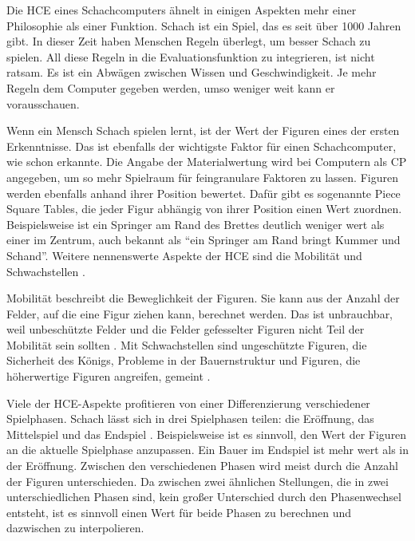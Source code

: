 Die \ac{HCE} eines Schachcomputers ähnelt in einigen Aspekten mehr einer Philosophie als einer Funktion. Schach ist ein Spiel, das es seit über 1000 Jahren gibt. In dieser Zeit haben Menschen Regeln überlegt, um besser Schach zu spielen. All diese Regeln in die Evaluationsfunktion zu integrieren, ist nicht ratsam. Es ist ein Abwägen zwischen Wissen und Geschwindigkeit. Je mehr Regeln dem Computer gegeben werden, umso weniger weit kann er vorausschauen.

Wenn ein Mensch Schach spielen lernt, ist der Wert der Figuren eines der ersten Erkenntnisse. Das ist ebenfalls der wichtigste Faktor für einen Schachcomputer, wie schon \citeauthor{Shannon1950} \citeyear{Shannon1950} \cite{Shannon1950} erkannte. Die Angabe der Materialwertung wird bei Computern als \ac{CP} angegeben, um so mehr Spielraum für feingranulare Faktoren zu lassen. Figuren werden ebenfalls anhand ihrer Position bewertet. Dafür gibt es sogenannte Piece Square Tables, die jeder Figur abhängig von ihrer Position einen Wert zuordnen. Beispielsweise ist ein Springer am Rand des Brettes deutlich weniger wert als einer im Zentrum, auch bekannt als \enquote{ein Springer am Rand bringt Kummer und Schand}. Weitere nennenswerte Aspekte der \ac{HCE} sind die Mobilität und Schwachstellen \cite[S. 228]{Levy1988}.

Mobilität beschreibt die Beweglichkeit der Figuren. Sie kann aus der Anzahl der Felder, auf die eine Figur ziehen kann, berechnet werden. Das ist unbrauchbar, weil unbeschützte Felder und die Felder gefesselter Figuren nicht Teil der Mobilität sein sollten \cite[S. 228]{Levy1988}. Mit Schwachstellen sind ungeschützte Figuren, die Sicherheit des Königs, Probleme in der Bauernstruktur und Figuren, die höherwertige Figuren angreifen, gemeint \cite[S. 228]{Levy1988}.

Viele der \ac{HCE}-Aspekte profitieren von einer Differenzierung verschiedener Spielphasen. Schach lässt sich in drei Spielphasen teilen: die Eröffnung, das Mittelspiel und das Endspiel \cite[S. 8]{Levy1988}. Beispielsweise ist es sinnvoll, den Wert der Figuren an die aktuelle Spielphase anzupassen. Ein Bauer im Endspiel ist mehr wert als in der Eröffnung. Zwischen den verschiedenen Phasen wird meist durch die Anzahl der Figuren unterschieden. Da zwischen zwei ähnlichen Stellungen, die in zwei unterschiedlichen Phasen sind, kein großer Unterschied durch den Phasenwechsel entsteht, ist es sinnvoll einen Wert für beide Phasen zu berechnen und dazwischen zu interpolieren.

